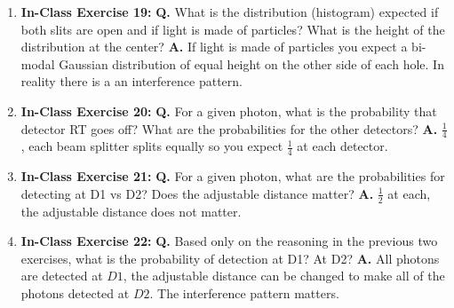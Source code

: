 \documentclass[main.tex]{subfiles}
\begin{document}
\begin{enumerate}
\item[] \textbf{In-Class Exercise 19:} \textbf{Q.} What is the distribution (histogram) expected if both slits are open and if light is made of particles? What is the height of the distribution at the center? \textbf{A.} If light is made of particles you expect a bi-modal Gaussian distribution of equal height on the other side of each hole. In reality there is a an interference pattern.

\item[] \textbf{In-Class Exercise 20:} \textbf{Q.} For a given photon, what is the probability that detector RT goes off? What are the probabilities for the other detectors? \textbf{A.} $\frac{1}{4}$, each beam splitter splits equally so you expect $\frac{1}{4}$ at each detector.

\item[] \textbf{In-Class Exercise 21:} \textbf{Q.} For a given photon, what are the probabilities for detecting at D1 vs D2? Does the adjustable distance matter? \textbf{A.} $\frac{1}{2}$ at each, the adjustable distance does not matter.

\item[] \textbf{In-Class Exercise 22:} \textbf{Q.} Based only on the reasoning in the previous two exercises, what is the probability of detection at D1? At D2? \textbf{A.} All photons are detected at $D1$, the adjustable distance can be changed to make all of the photons detected at $D2$. The interference pattern matters.

\end{enumerate}
\end{document}
